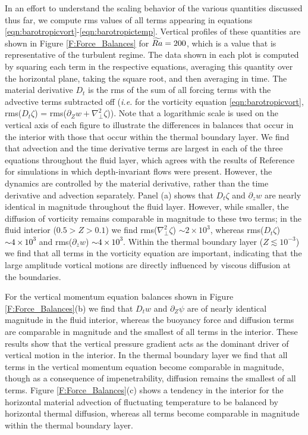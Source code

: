 In an effort to understand the scaling behavior of the various quantities discussed thus far, we compute rms values of all terms appearing in equations \eqref{eqn:barotropicvort}-\eqref{eqn:barotropictemp}. Vertical profiles of these quantities are shown in Figure \ref{F:Force_Balances} for $\widetilde{Ra} = 200$, which is a value that is representative of the turbulent regime. The data shown in each plot is computed by squaring each term in the respective equations, averaging this quantity over the horizontal plane, taking the square root, and then averaging in time. The material derivative $D_{t}$ is the rms of the sum of all forcing terms with the advective terms subtracted off (\textit{i.e.} for the vorticity equation \eqref{eqn:barotropicvort}, rms($D_{t}\zeta$) = rms($\partial_{Z}w + \nabla_{\perp}^{2}\zeta$)). Note that a logarithmic scale is used on the vertical axis of each figure to illustrate the differences in balances that occur in the interior with those that occur within the thermal boundary layer. 
We find that advection and the time derivative terms are largest in each of the three equations throughout the fluid layer, which agrees with the results of Reference \cite{sM21} for simulations in which depth-invariant flows were present. 
However, the dynamics are controlled by the material derivative, rather than the time derivative and advection separately. 
Panel (a) shows that  $D_t \zeta$ and $\partial_z w$ are nearly identical in magnitude throughout the fluid layer. However, while smaller, the diffusion of vorticity remains comparable in magnitude to these two terms; in the fluid interior ($0.5 > Z > 0.1$) we find rms($\nabla_\perp^2 \zeta$) $\sim 2 \times 10^3$, whereas rms($D_t \zeta$) \textcolor{black}{$\sim 4 \times 10^3$} and rms($\partial_z w$) \textcolor{black}{$\sim 4 \times 10^3$}. Within the thermal boundary layer ($Z \lesssim 10^{-3}$) we find that all terms in the vorticity equation are important, indicating that the large amplitude vortical motions are directly influenced by viscous diffusion at the boundaries. 

For the vertical momentum equation balances shown in Figure \ref{F:Force_Balances}(b) we find that $D_t w$ and $\partial_Z \psi$ are of nearly identical magnitude in the fluid interior, whereas the buoyancy force and diffusion terms are comparable in magnitude and the smallest of all terms in the interior. These results show that the vertical pressure gradient acts as the dominant driver of vertical motion in the interior. In the thermal boundary layer we find that all terms in the vertical momentum equation become comparable in magnitude, though as a consequence of impenetrability, diffusion remains the smallest of all terms. Figure \ref{F:Force_Balances}(c) shows a tendency in the interior for the horizontal material advection of fluctuating temperature to be balanced by horizontal thermal diffusion, whereas all terms become comparable in magnitude within the thermal boundary layer.


